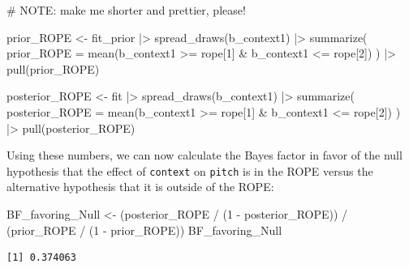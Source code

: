 \documentclass[
  doc,
  floatsintext,
  longtable,
  nolmodern,
  notxfonts,
  notimes,
  colorlinks=true,linkcolor=blue,citecolor=blue,urlcolor=blue]{apa7}
\newenvironment{Shaded}{\begin{snugshade}}{\end{snugshade}}
\newcommand{\AlertTok}[1]{\textcolor[rgb]{0.68,0.00,0.00}{#1}}
\newcommand{\AttributeTok}[1]{\textcolor[rgb]{0.40,0.45,0.13}{#1}}
\newcommand{\CommentTok}[1]{\textcolor[rgb]{0.37,0.37,0.37}{#1}}
\newcommand{\DecValTok}[1]{\textcolor[rgb]{0.68,0.00,0.00}{#1}}
\newcommand{\FunctionTok}[1]{\textcolor[rgb]{0.28,0.35,0.67}{#1}}
\newcommand{\NormalTok}[1]{\textcolor[rgb]{0.00,0.23,0.31}{#1}}
\newcommand{\OtherTok}[1]{\textcolor[rgb]{0.00,0.23,0.31}{#1}}
\newcommand{\SpecialCharTok}[1]{\textcolor[rgb]{0.37,0.37,0.37}{#1}}
\begin{document}
\begin{Shaded}
\begin{Highlighting}[]
\CommentTok{\# }\AlertTok{NOTE}\CommentTok{: make me shorter and prettier, please!}

\NormalTok{prior\_ROPE }\OtherTok{\textless{}{-}}\NormalTok{ fit\_prior }\SpecialCharTok{|\textgreater{}} 
  \FunctionTok{spread\_draws}\NormalTok{(b\_context1) }\SpecialCharTok{|\textgreater{}} 
  \FunctionTok{summarize}\NormalTok{(}
    \AttributeTok{prior\_ROPE =} \FunctionTok{mean}\NormalTok{(b\_context1 }\SpecialCharTok{\textgreater{}=}\NormalTok{ rope[}\DecValTok{1}\NormalTok{] }\SpecialCharTok{\&}\NormalTok{ b\_context1 }\SpecialCharTok{\textless{}=}\NormalTok{ rope[}\DecValTok{2}\NormalTok{])}
\NormalTok{  ) }\SpecialCharTok{|\textgreater{}}
  \FunctionTok{pull}\NormalTok{(prior\_ROPE)}

\NormalTok{posterior\_ROPE }\OtherTok{\textless{}{-}}\NormalTok{ fit }\SpecialCharTok{|\textgreater{}} 
  \FunctionTok{spread\_draws}\NormalTok{(b\_context1) }\SpecialCharTok{|\textgreater{}} 
  \FunctionTok{summarize}\NormalTok{(}
    \AttributeTok{posterior\_ROPE =} \FunctionTok{mean}\NormalTok{(b\_context1 }\SpecialCharTok{\textgreater{}=}\NormalTok{ rope[}\DecValTok{1}\NormalTok{] }\SpecialCharTok{\&}\NormalTok{ b\_context1 }\SpecialCharTok{\textless{}=}\NormalTok{ rope[}\DecValTok{2}\NormalTok{])}
\NormalTok{  ) }\SpecialCharTok{|\textgreater{}} 
  \FunctionTok{pull}\NormalTok{(posterior\_ROPE)}
\end{Highlighting}
\end{Shaded}

Using these numbers, we can now calculate the Bayes factor in favor of
the null hypothesis that the effect of \texttt{context} on
\texttt{pitch} is in the ROPE versus the alternative hypothesis that it
is outside of the ROPE:

\begin{Shaded}
\begin{Highlighting}[]
\NormalTok{BF\_favoring\_Null }\OtherTok{\textless{}{-}}\NormalTok{ (posterior\_ROPE }\SpecialCharTok{/}\NormalTok{ (}\DecValTok{1} \SpecialCharTok{{-}}\NormalTok{ posterior\_ROPE)) }\SpecialCharTok{/}
\NormalTok{                    (prior\_ROPE }\SpecialCharTok{/}\NormalTok{ (}\DecValTok{1} \SpecialCharTok{{-}}\NormalTok{ prior\_ROPE))}
\NormalTok{BF\_favoring\_Null}
\end{Highlighting}
\end{Shaded}

\begin{verbatim}
[1] 0.374063
\end{verbatim}
\end{document}
